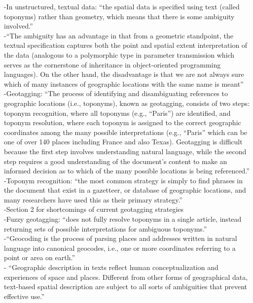 -{\color{orange}In unstructured, textual data: “the spatial data is specified using text (called toponyms) rather than geometry, which means that there is some ambiguity involved.”\cite{Lieberman2010}}\\
-{\color{orange}“The ambiguity has an advantage in that from a geometric standpoint, the textual specification captures both the point and spatial extent interpretation of the data (analogous to a polymorphic type in parameter transmission which serves as the cornerstone of inheritance in object-oriented programming languages). On the other hand, the disadvantage is that we are not always sure which of many instances of geographic locations with the same name is meant”\cite{Lieberman2010}}\\
-{\color{orange}Geotagging: “The process of identifying and disambiguating references to geographic locations (i.e., toponyms), known as geotagging, consists of two steps: toponym recognition, where all toponyms (e.g., “Paris”) are identified, and toponym resolution, where each toponym is assigned to the correct geographic coordinates among the many possible interpretations (e.g., “Paris” which can be one of over 140 places including France and also Texas). Geotagging is difficult because the first step involves understanding natural language, while the second step requires a good understanding of the document’s content to make an informed decision as to which of the many possible locations is being referenced.”\cite{Lieberman2010}}\\
-{\color{orange}Toponym recognition: “the most common strategy is simply to find phrases in the document that exist in a gazetteer, or database of geographic locations, and many researchers have used this as their primary strategy.”\cite{Lieberman2010}}\\
-{\color{red}Section 2 for shortcomings of current geotagging strategies\cite{Lieberman2010}}\\
-{\color{orange}Fuzzy geotagging: “does not fully resolve toponyms in a single article, instead returning sets of possible interpretations for ambiguous toponyms.''\cite{Lieberman2010}}\\
-{\color{orange}“Geocoding is the process of parsing places and addresses written in natural language into canonical geocodes, i.e., one or more coordinates referring to a point or area on earth.”\cite{Hamborg2019}}\\
-{\color{orange} “Geographic description in texts reflect human conceptualization and experiences of space and places. Different from other forms of geographical data, text-based spatial description are subject to all sorts of ambiguities that prevent effective use.”\cite{Cai2016}}\\
